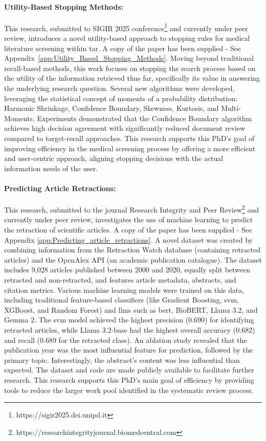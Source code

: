 \documentclass[10pt,oneside]{book}
\begin{document}
\paragraph{Utility-Based Stopping Methods:}
This research, submitted to SIGIR 2025 conference\footnote{https://sigir2025.dei.unipd.it} and currently under peer review, introduces a novel utility-based approach to stopping rules for medical literature screening within \gls*{tar}. A copy of the paper has been supplied - See Appendix~\ref{app:Utility_Based_Stopping_Methods}. Moving beyond traditional recall-based methods, this work focuses on stopping the search process based on the utility of the information retrieved thus far, specifically its value in answering the underlying research question. Several new algorithms were developed, leveraging the statistical concept of moments of a probability distribution: Harmonic Shrinkage, Confidence Boundary, Skewness, Kurtosis, and Multi-Moments. Experiments demonstrated that the Confidence Boundary algorithm achieves high decision agreement with significantly reduced document review compared to target-recall approaches. This research supports this PhD's goal of improving efficiency in the medical screening process by offering a more efficient and user-centric approach, aligning stopping decisions with the actual information needs of the user.

\paragraph{Predicting Article Retractions:}
This research, submitted to the journal Research Integrity and Peer Review\footnote{https://researchintegrityjournal.biomedcentral.com} and currently under peer review, investigates the use of machine learning to predict the retraction of scientific articles. A copy of the paper has been supplied - See Appendix \ref{app:Predicting_article_retractions}. A novel dataset was created by combining information from the Retraction Watch database (containing retracted articles) and the OpenAlex API (an academic publication catalogue). The dataset includes 9,028 articles published between 2000 and 2020, equally split between retracted and non-retracted, and features article metadata, abstracts, and citation metrics. Various machine learning models were trained on this data, including traditional feature-based classifiers (like Gradient Boosting, \gls*{svm}, XGBoost, and Random Forest) and \glspl*{llm} such as \gls*{bert}, BioBERT, Llama 3.2, and Gemma 2. The \gls*{svm} model achieved the highest precision (0.690) for identifying retracted articles, while Llama 3.2-base had the highest overall accuracy (0.682) and recall (0.689 for the retracted class). An ablation study revealed that the publication year was the most influential feature for prediction, followed by the primary topic. Interestingly, the abstract's content was less influential than expected. The dataset and code are made publicly available to facilitate further research. This research supports this PhD's main goal of efficiency by providing tools to reduce the larger work pool identified in the systematic review process.
\end{document}
